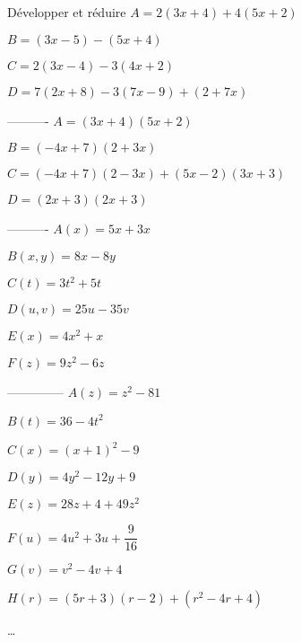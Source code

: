 \begin{exercice*}
    Développer et réduire
$A=2(3x+4)+4(5x+2)$\par
$B=(3x-5)-(5x+4)$\par
$C=2(3x-4)-3(4x+2)$\par
$D=7(2x+8)-3(7x-9)+(2+7x)$ \par
----------
$A=(3x+4)(5x+2)$\par
$B=(-4x+7)(2+3x)$\par
$C=(-4x+7)(2-3x) +(5x-2)(3x+3)$\par
$D=(2x+3)(2x+3)$

----------
$A(x)=5x+3x$\par
$B(x,y)=8x-8y$\par
$C(t)=3t^2+5t$\par
$D(u,v)=25u-35v$\par
$E(x)=4x^2+x$\par
$F(z)=9z^2-6z$

--------------
$A(z)=z^2-81$\par
$B(t)=36-4t^2$\par
$C(x)=(x+1)^2-9$\par
$D(y)=4y^2-12y+9$\par
$E(z)=28z+4+49z^2$\par
$F(u)=4u^2+3u+\dfrac{9}{16}$\par
$G(v)=v^2-4v+4$\par
$H(r)=(5r+3)(r-2)+(r^2-4r+4)$
\end{exercice*}
\begin{corrige}
    \dots
\end{corrige}

